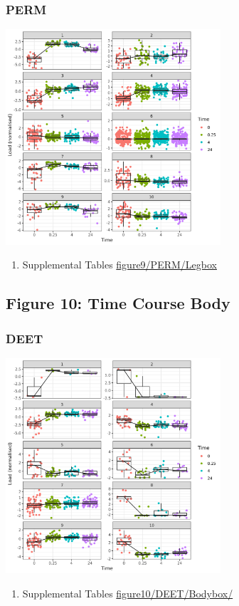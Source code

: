 \documentclass[11pt]{article}
\begin{document}
\subsubsection{PERM}
\label{sec:orgf75c4fd}
\begin{center}
\includegraphics[width=0.6\textwidth]{figure9/PERM/Legbox.png}
\end{center}
\begin{enumerate}
\item Supplemental Tables
\label{sec:org740262e}
\url{figure9/PERM/Legbox}
\end{enumerate}
\subsection{Figure 10: Time Course Body}
\label{sec:org42e7e0f}
\subsubsection{DEET}
\label{sec:orge600387}
\begin{center}
\includegraphics[width=0.6\textwidth]{figure10/DEET/Bodybox.png}
\end{center}
\begin{enumerate}
\item Supplemental Tables
\label{sec:orgcde0dbf}
\url{figure10/DEET/Bodybox/}
\end{enumerate}
\end{document}
